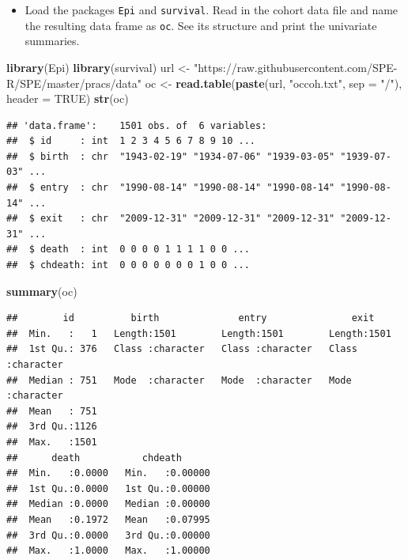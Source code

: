 \documentclass[
]{book}
\newenvironment{Shaded}{\begin{snugshade}}{\end{snugshade}}
\newcommand{\AttributeTok}[1]{\textcolor[rgb]{0.13,0.29,0.53}{#1}}
\newcommand{\ConstantTok}[1]{\textcolor[rgb]{0.56,0.35,0.01}{#1}}
\newcommand{\FunctionTok}[1]{\textcolor[rgb]{0.13,0.29,0.53}{\textbf{#1}}}
\newcommand{\NormalTok}[1]{#1}
\newcommand{\OtherTok}[1]{\textcolor[rgb]{0.56,0.35,0.01}{#1}}
\newcommand{\StringTok}[1]{\textcolor[rgb]{0.31,0.60,0.02}{#1}}
\providecommand{\tightlist}{%
  \setlength{\itemsep}{0pt}\setlength{\parskip}{0pt}}
\begin{document}
\begin{itemize}
\tightlist
\item
  Load the packages \texttt{Epi} and \texttt{survival}.
  Read in the cohort data file and name
  the resulting data frame as \texttt{oc}.
  See its structure and print the univariate summaries.
\end{itemize}

\begin{Shaded}
\begin{Highlighting}[]
\FunctionTok{library}\NormalTok{(Epi)}
\FunctionTok{library}\NormalTok{(survival)}
\NormalTok{url }\OtherTok{\textless{}{-}} \StringTok{"https://raw.githubusercontent.com/SPE{-}R/SPE/master/pracs/data"}
\NormalTok{oc }\OtherTok{\textless{}{-}} \FunctionTok{read.table}\NormalTok{(}\FunctionTok{paste}\NormalTok{(url, }\StringTok{"occoh.txt"}\NormalTok{, }\AttributeTok{sep =} \StringTok{"/"}\NormalTok{), }\AttributeTok{header =} \ConstantTok{TRUE}\NormalTok{)}
\FunctionTok{str}\NormalTok{(oc)}
\end{Highlighting}
\end{Shaded}

\begin{verbatim}
## 'data.frame':    1501 obs. of  6 variables:
##  $ id     : int  1 2 3 4 5 6 7 8 9 10 ...
##  $ birth  : chr  "1943-02-19" "1934-07-06" "1939-03-05" "1939-07-03" ...
##  $ entry  : chr  "1990-08-14" "1990-08-14" "1990-08-14" "1990-08-14" ...
##  $ exit   : chr  "2009-12-31" "2009-12-31" "2009-12-31" "2009-12-31" ...
##  $ death  : int  0 0 0 0 1 1 1 1 0 0 ...
##  $ chdeath: int  0 0 0 0 0 0 0 1 0 0 ...
\end{verbatim}

\begin{Shaded}
\begin{Highlighting}[]
\FunctionTok{summary}\NormalTok{(oc)}
\end{Highlighting}
\end{Shaded}

\begin{verbatim}
##        id          birth              entry               exit          
##  Min.   :   1   Length:1501        Length:1501        Length:1501       
##  1st Qu.: 376   Class :character   Class :character   Class :character  
##  Median : 751   Mode  :character   Mode  :character   Mode  :character  
##  Mean   : 751                                                           
##  3rd Qu.:1126                                                           
##  Max.   :1501                                                           
##      death           chdeath       
##  Min.   :0.0000   Min.   :0.00000  
##  1st Qu.:0.0000   1st Qu.:0.00000  
##  Median :0.0000   Median :0.00000  
##  Mean   :0.1972   Mean   :0.07995  
##  3rd Qu.:0.0000   3rd Qu.:0.00000  
##  Max.   :1.0000   Max.   :1.00000
\end{verbatim}
\end{document}
